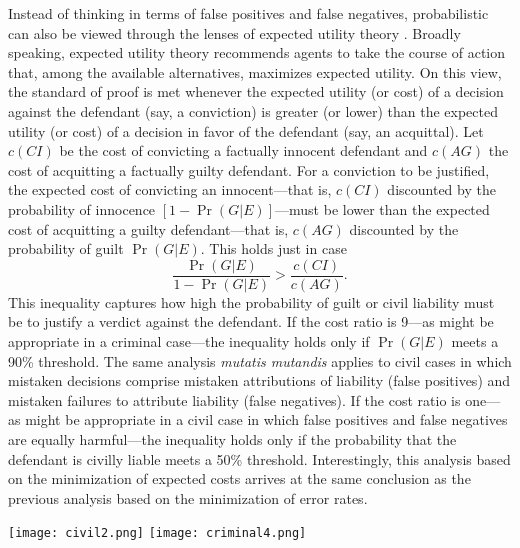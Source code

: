\documentclass{article}
\begin{document}
Instead of thinking in terms of false positives and false negatives, probabilistic can also be viewed through the lenses of expected utility theory  \citep{kaplan1968decision, Dekay1996, hamer2004}. Broadly speaking, expected utility theory recommends agents to take the course of action that, among the available alternatives,  maximizes expected utility. On this view, 
the standard of proof is met whenever the expected utility (or cost) of a decision against the defendant (say, a conviction) is greater (or lower) than the expected utility (or cost) of a decision in favor of the defendant (say, an acquittal).
Let $c(CI)$ be the cost of convicting a factually innocent defendant and $c(AG)$ the cost of acquitting a factually guilty defendant. For a conviction to be justified, the expected cost of convicting an innocent---that is, $c(CI)$  discounted by the probability of innocence $[1-\Pr(G|E)]$---must be lower than the expected cost of acquitting a guilty defendant---that is, $c(AG)$ discounted by the probability of guilt $\Pr(G|E)$. This holds just in case 
%
\[ \frac{\Pr(G|E)}{1- \Pr(G|E)} > \frac{c(CI)}{c(AG)}.\]
%
This inequality captures 
how high the probability 
of guilt or civil liability must be to justify a verdict against the defendant. 
If the cost ratio is 9---as might be appropriate in a criminal 
case---the inequality holds only if $\Pr(G | E)$ meets a 90\% threshold.
%
The same analysis \textit{mutatis mutandis} applies to civil cases in which mistaken decisions comprise mistaken attributions of liability (false positives) and mistaken failures to attribute liability (false negatives). If the cost ratio is one---as might be appropriate in a civil case in which false positives and false negatives are equally harmful---the inequality holds only if the probability that the defendant is civilly liable meets a 50\% threshold. Interestingly, this analysis based on the minimization of expected costs arrives at the same conclusion as the previous analysis based on the minimization of error rates. 


%
%


\begin{center}
\texttt{[image: civil2.png]}
\texttt{[image: criminal4.png]}   
\end{center}
\end{document}
